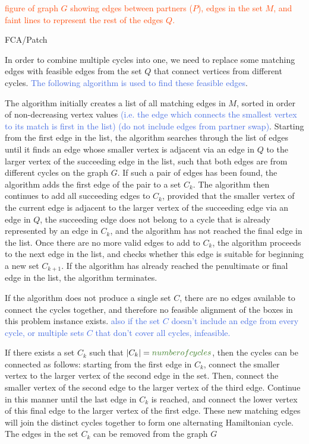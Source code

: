 \documentclass[oribibl]{llncs}
\begin{document}
\textcolor{OrangeRed}{figure of graph $G$ showing edges between partners ($P$), edges in the set $M$, and faint lines to represent the rest of the edges $Q$.}


FCA/Patch

In order to combine multiple cycles into one, we need to replace some matching edges with feasible edges from the set $Q$ that connect vertices from different cycles. \textcolor{RoyalBlue}{The following algorithm is used to find these feasible edges}.

The algorithm initially creates a list of all matching edges in $M$, sorted in order of non-decreasing vertex values \textcolor{RoyalBlue}{(i.e. the edge which connects the smallest vertex to its match is first in the list) (do not include edges from partner swap)}. Starting from the first edge in the list, the algorithm searches through the list of edges until it finds an edge whose smaller vertex is adjacent via an edge in $Q$ to the larger vertex of the succeeding edge in the list, such that both edges are from different cycles on the graph $G$. If such a pair of edges has been found, the algorithm adds the first edge of the pair to a set $C_k$. The algorithm then continues to add all succeeding edges to $C_k$, provided that the smaller vertex of the current edge is adjacent to the larger vertex of the succeeding edge via an edge in $Q$, the succeeding edge does not belong to a cycle that is already represented by an edge in $C_k$, and the algorithm has not reached the final edge in the list. Once there are no more valid edges to add to $C_k$, the algorithm proceeds to the next edge in the list, and checks whether this edge is suitable for beginning a new set $C_{k+1}$. If the algorithm has already reached the penultimate or final edge in the list, the algorithm terminates.

If the algorithm does not produce a single set $C$, there are no edges available to connect the cycles together, and therefore no feasible alignment of the boxes in this problem instance exists. \textcolor{RoyalBlue}{also if the set $C$ doesn't include an edge from every cycle, or multiple sets $C$ that don't cover all cycles, infeasible.}

If there exists a set $C_k$ such that $|C_k| = \textcolor{OliveGreen}{number of cycles}$, then the cycles can be connected as follows: starting from the first edge in $C_k$, connect the smaller vertex to the larger vertex of the second edge in the set. Then, connect the smaller vertex of the second edge to the larger vertex of the third edge. Continue in this manner until the last edge in $C_k$ is reached, and connect the lower vertex of this final edge to the larger vertex of the first edge. These new matching edges will join the distinct cycles together to form one alternating Hamiltonian cycle. The edges in the set $C_k$ can be removed from the graph $G$
\end{document}
